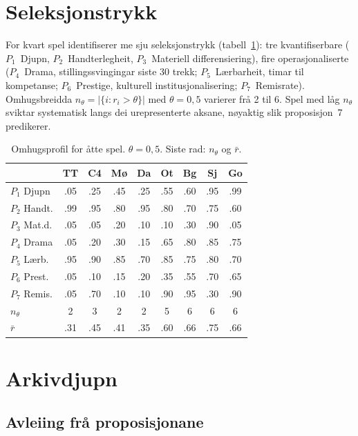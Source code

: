 \documentclass[10pt,twocolumn]{article}
\begin{document}
\section{Seleksjonstrykk}

For kvart spel identifiserer me sju seleksjonstrykk (tabell~\ref{tab:omhug}): tre kvantifiserbare ($P_1$~Djupn, $P_2$~Handterlegheit, $P_3$~Materiell differensiering), fire operasjonaliserte ($P_4$~Drama, stillingssvingingar siste 30 trekk; $P_5$~L\ae rbarheit, timar til kompetanse; $P_6$~Prestige, kulturell institusjonalisering; $P_7$~Remisrate). Omhugsbreidda $n_\theta = |\{i : r_i > \theta\}|$ med $\theta = 0{,}5$ varierer fr\aa{} 2 til 6. Spel med l\aa g $n_\theta$ sviktar systematisk langs dei urepresenterte aksane, n\o yaktig slik proposisjon~7 predikerer.

\begin{table}[t]
\centering\scriptsize
\caption{Omhugsprofil for \aa tte spel. $\theta = 0{,}5$. Siste rad: $n_\theta$ og $\bar{r}$.}
\label{tab:omhug}
\begin{tabular}{@{}lcccccccc@{}}
\toprule
& TT & C4 & M\o & Da & Ot & Bg & Sj & Go \\
\midrule
$P_1$ Djupn & .05 & .25 & .45 & .25 & .55 & .60 & .95 & .99 \\
$P_2$ Handt. & .99 & .95 & .80 & .95 & .80 & .70 & .75 & .60 \\
$P_3$ Mat.d. & .05 & .05 & .20 & .10 & .10 & .30 & .90 & .05 \\
$P_4$ Drama & .05 & .20 & .30 & .15 & .65 & .80 & .85 & .75 \\
$P_5$ L\ae rb. & .95 & .90 & .85 & .70 & .85 & .75 & .80 & .70 \\
$P_6$ Prest. & .05 & .10 & .15 & .20 & .35 & .55 & .70 & .65 \\
$P_7$ Remis. & .05 & .70 & .10 & .10 & .90 & .95 & .30 & .90 \\
\midrule
$n_\theta$ & 2 & 3 & 2 & 2 & 5 & 6 & 6 & 6 \\
$\bar{r}$ & .31 & .45 & .41 & .35 & .60 & .66 & .75 & .66 \\
\bottomrule
\end{tabular}
\end{table}


\section{Arkivdjupn}

\subsection{Avleiing fr\aa{} proposisjonane}
\end{document}
